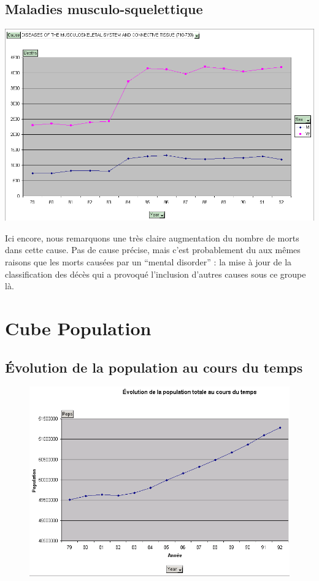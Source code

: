 \subsection{Maladies musculo-squelettique}

    \includegraphics[scale=0.5]{images/muscoskeletal.png}

    Ici encore, nous remarquons une très claire augmentation du nombre de morts dans cette cause. Pas de cause précise, mais c'est probablement du aux mêmes
    raisons que les morts causées par un ``mental disorder'' : la mise à jour de la classification des décès qui a provoqué l'inclusion d'autres causes sous
    ce groupe là.

\pagebreak


\section{Cube Population}
\subsection{Évolution de la population au cours du temps}
\begin{figure}[h!]
    \centering
    \includegraphics[width=\linewidth]{images/pop/evolutionPopulation.png}
\end{figure}

